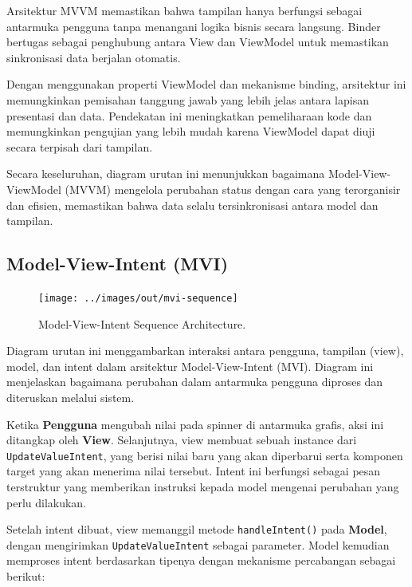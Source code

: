 Arsitektur MVVM memastikan bahwa tampilan hanya berfungsi sebagai antarmuka pengguna tanpa menangani logika bisnis secara langsung. Binder bertugas sebagai penghubung antara View dan ViewModel untuk memastikan sinkronisasi data berjalan otomatis. 

Dengan menggunakan properti ViewModel dan mekanisme binding, arsitektur ini memungkinkan pemisahan tanggung jawab yang lebih jelas antara lapisan presentasi dan data. Pendekatan ini meningkatkan pemeliharaan kode dan memungkinkan pengujian yang lebih mudah karena ViewModel dapat diuji secara terpisah dari tampilan.

Secara keseluruhan, diagram urutan ini menunjukkan bagaimana Model-View-ViewModel (MVVM) mengelola perubahan status dengan cara yang terorganisir dan efisien, memastikan bahwa data selalu tersinkronisasi antara model dan tampilan.


\subsection{Model-View-Intent (MVI)}
\begin{figure}[h]
	\centering
	\texttt{[image: ../images/out/mvi-sequence]}
	\caption{Model-View-Intent Sequence Architecture.}
	\label{fig:mvi-sequence}
\end{figure}

Diagram urutan ini menggambarkan interaksi antara pengguna, tampilan (view), model, dan intent dalam arsitektur Model-View-Intent (MVI). Diagram ini menjelaskan bagaimana perubahan dalam antarmuka pengguna diproses dan diteruskan melalui sistem.

Ketika \textbf{Pengguna} mengubah nilai pada spinner di antarmuka grafis, aksi ini ditangkap oleh \textbf{View}. Selanjutnya, view membuat sebuah instance dari \texttt{UpdateValueIntent}, yang berisi nilai baru yang akan diperbarui serta komponen target yang akan menerima nilai tersebut. Intent ini berfungsi sebagai pesan terstruktur yang memberikan instruksi kepada model mengenai perubahan yang perlu dilakukan.

Setelah intent dibuat, view memanggil metode \texttt{handleIntent()} pada \textbf{Model}, dengan mengirimkan \texttt{UpdateValueIntent} sebagai parameter. Model kemudian memproses intent berdasarkan tipenya dengan mekanisme percabangan sebagai berikut:

